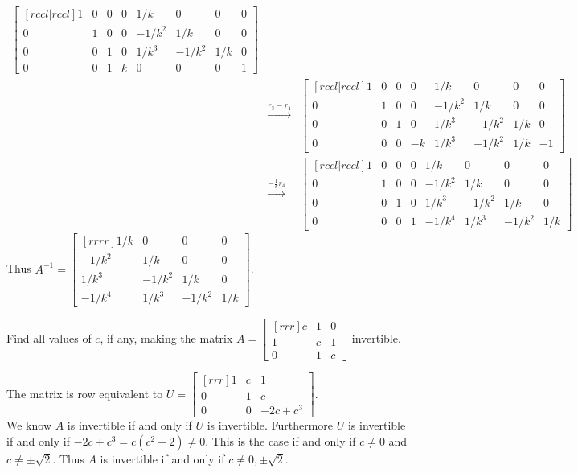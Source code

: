 \begin{solution}
\begin{eqnarray*}
\begin{bmatrix}[rccl|rccl]
1&0&0&0&1/k&0&0&0\\
0&1&0&0&-1/k^2&1/k&0&0\\
0&0&1&0&1/k^3&-1/k^2&1/k&0\\
0&0&1&k&0&0&0&1
\end{bmatrix}\\
&\xrightarrow[]{r_3 - r_4}&
\begin{bmatrix}[rccl|rccl]
1&0&0&0&1/k&0&0&0\\
0&1&0&0&-1/k^2&1/k&0&0\\
0&0&1&0&1/k^3&-1/k^2&1/k&0\\
0&0&0&-k&1/k^3&-1/k^2&1/k&-1
\end{bmatrix}\\
&\xrightarrow[]{-\frac{1}{k}r_4}&
\begin{bmatrix}[rccl|rccl]
1&0&0&0&1/k&0&0&0\\
0&1&0&0&-1/k^2&1/k&0&0\\
0&0&1&0&1/k^3&-1/k^2&1/k&0\\
0&0&0&1&-1/k^4&1/k^3&-1/k^2&1/k
\end{bmatrix}
\end{eqnarray*}
Thus $A^{-1}=\begin{bmatrix}[rrrr]
1/k&0&0&0\\
-1/k^2&1/k&0&0\\
1/k^3&-1/k^2&1/k&0\\
-1/k^4&1/k^3&-1/k^2&1/k
\end{bmatrix}$.
\end{solution}

\ii Find all values of $c$, if any, making the matrix $A=\begin{bmatrix}[rrr]
c&1&0\\
1&c&1\\
0&1&c
\end{bmatrix}$
invertible. 
\\
\begin{solution} The matrix is row equivalent to $U=\begin{bmatrix}[rrr]
1&c&1\\
0&1&c\\
0&0&-2c+c^3
\end{bmatrix}$.
\vspace{.1in}\\
We know $A$ is invertible if and only if $U$ is invertible. Furthermore $U$ is invertible if and only if $-2c+c^3=c(c^2-2)\ne 0$. This is the case if and only if $c\ne 0$ and $c\ne \pm \sqrt{2}$. Thus $A$ is invertible if and only if $c \neq 0, \pm\sqrt{2}$.
\end{solution}

